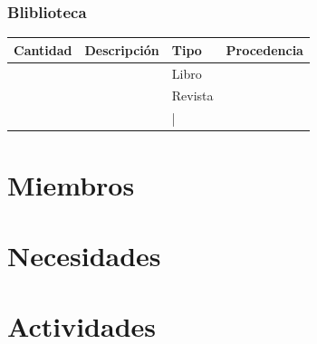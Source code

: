 \documentclass[a4paper,11pt]{article}                 %
\begin{document}
  \subsubsection{Bliblioteca}
    \begin{table}[H]
    \centering
    \begin{tabular}{|c|l|l|l|}
    \hline
    Cantidad & Descripción & Tipo & Procedencia \\ \hline
             &             & Libro   &              \\ \hline
             &             & Revista &              \\ \hline
             &             &        |&              \\ \hline
    \end{tabular}
    \end{table}
  \section{Miembros}
  \section{Necesidades}
  \section{Actividades}
  
  
  
   
  


\end{document}
